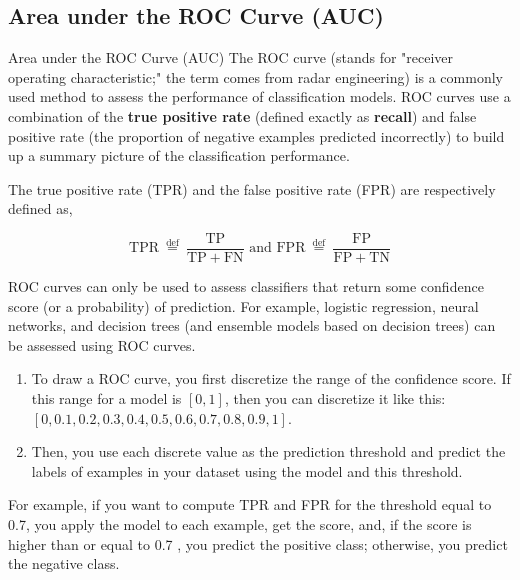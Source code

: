 \documentclass[8pt,dvipsnames]{beamer}
\begin{document}
\subsection{Area under the ROC Curve (AUC)}
\begin{frame}{Area under the ROC Curve (AUC)}
	The ROC curve (stands for "receiver operating characteristic;" the term comes from radar engineering) is a commonly used method to assess the performance of classification models. ROC curves use a combination of the \textbf{true positive rate} (defined exactly as \textbf{recall}) and false positive rate (the proportion of negative examples predicted incorrectly) to build up a summary picture of the classification performance.

	The true positive rate (TPR) and the false positive rate (FPR) are respectively defined as,

	$$
		\mathrm{TPR} \stackrel{\text { def }}{=} \frac{\mathrm{TP}}{\mathrm{TP}+\mathrm{FN}} \text { and } \mathrm{FPR} \stackrel{\text { def }}{=} \frac{\mathrm{FP}}{\mathrm{FP}+\mathrm{TN}}
	$$

	ROC curves can only be used to assess classifiers that return some confidence score (or a probability) of prediction. For example, logistic regression, neural networks, and decision trees (and ensemble models based on decision trees) can be assessed using ROC curves.
\end{frame}

\begin{frame}
	\begin{enumerate}
		\item To draw a ROC curve, you first discretize the range of the confidence score. If this range for a model is $[0,1]$, then you can discretize it like this: $[0,0.1,0.2,0.3,0.4,0.5,0.6,0.7,0.8,0.9,1]$.
		\item Then, you use each discrete value as the prediction threshold and predict the labels of examples in your dataset using the model and this threshold.
	\end{enumerate}
	For example, if you want to compute TPR and FPR for the threshold equal to 0.7, you apply the model to each example, get the score, and, if the score is higher than or equal to 0.7 , you predict the positive class; otherwise, you predict the negative class.
\end{frame}
\end{document}
